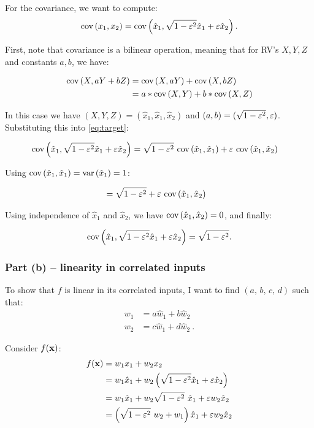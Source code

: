 For the covariance, we want to compute:
\begin{align}
  \text{cov}\left(x_1, x_2\right) =\text{cov}\left(\hat x_1, \sqrt{1 - \varepsilon^2} \hat x_1 + \varepsilon  \hat
  x_2\right)\label{eq:target}.
\end{align}


First, note that covariance is a bilinear operation, meaning that for
RV's $X, Y, Z$ and constants $a, b$, we have:

\begin{align*}
  \text{cov}\left(X, aY + bZ\right) &= \text{cov}\left(X, aY\right) + \text{cov}\left(X, bZ\right)\nonumber\\
                    &= a * \text{cov}\left(X, Y\right) + b * \text{cov}\left(X, Z\right)
\end{align*}

In this case we have $(X, Y, Z) = (\hat x_1, \hat x_1, \hat x_2)$ and
$(a, b) = (\sqrt{1 - \varepsilon^2}, \varepsilon)$. Substituting this into \cref{eq:target}:

\begin{align*}
  \text{cov}\left(\hat x_1, \sqrt{1 - \varepsilon^2} \hat x_1 + \varepsilon  \hat x_2\right) &=
  \sqrt{1 - \varepsilon^2}\  \text{cov}\left(\hat x_1, \hat x_1\right) + \varepsilon\  \text{cov}\left(\hat x_1, \hat
  x_2\right)
\end{align*}

Using $\text{cov}\left(\hat x_1, \hat x_1\right) = \text{var}\left(\hat x_1\right) = 1$:

\begin{align*}
  &= \sqrt{1 - \varepsilon^2} + \varepsilon\  \text{cov}\left(\hat x_1, \hat x_2\right)
\end{align*}

Using independence of $\hat x_1$ and $\hat x_2$, we have $\text{cov}\left(\hat
x_1, \hat x_2\right) = 0$, and finally:

\begin{align*}
\text{cov}\left(\hat x_1, \sqrt{1 - \varepsilon^2}  \hat x_1 + \varepsilon  \hat x_2\right) =
  \sqrt{1 - \varepsilon^2}.
\end{align*}


\subsubsection{Part (b) -- linearity in correlated inputs}

To show that $f$ is linear in its correlated inputs, I want to find $(a,\, b,\, c,\, d)$ such that:
\begin{align*}
  w_1 &= a\hat w_1 + b \hat w_2\\
  w_2 &= c\hat w_1 + d \hat w_2\ .
\end{align*}

Consider $f(\mathbf{x})$:
\begin{align*}
  f(\mathbf{x}) &= w_1 x_1 + w_2 x_2\\
            &= w_1\hat x_1 + w_2 \left(\sqrt{1 - \varepsilon^2}\hat x_1 + \varepsilon \hat x_2  \right)\\
            &= w_1 \hat x_1 + w_2 \sqrt{1 - \varepsilon^2}\ \hat x_1 + \varepsilon w_2 \hat
            x_2\\
            &= \left(\sqrt{1 - \varepsilon^2}\ w_2 + w_1\right) \hat x_1 + \varepsilon w_2 \hat x_2
\end{align*}

